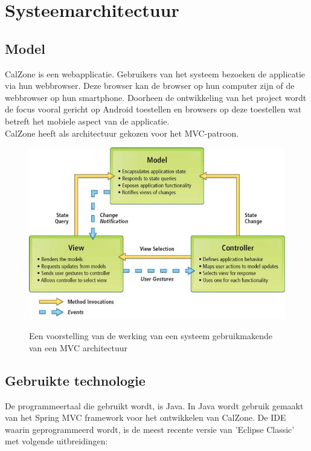 \chapter{Systeemarchitectuur}
\label{chap:architectuur}

\section{Model}
\label{sec:model}
CalZone is een webapplicatie. Gebruikers van het systeem bezoeken de applicatie via hun webbrowser. 
Deze browser kan de browser op hun computer zijn of de webbrowser op hun smartphone.
Doorheen de ontwikkeling van het project wordt de focus vooral gericht op Android toestellen en browsers op deze toestellen wat betreft het mobiele aspect van de applicatie.
\\
CalZone heeft als architectuur gekozen voor het MVC-patroon.\cite{mvc}

\begin{figure}[H]
	\centering
	\includegraphics[scale=0.5]{img/mvc}
	\label{fig:mvc}
	\caption{Een voorstelling van de werking van een systeem gebruikmakende van een MVC architectuur}
\end{figure}

\section{Gebruikte technologie}
\label{sec:technologie}
De programmeertaal die gebruikt wordt, is Java. 
In Java wordt gebruik gemaakt van het Spring MVC framework\cite{spring, spring-mvc} voor het ontwikkelen van CalZone. 
De IDE waarin geprogrammeerd wordt, is de meest recente versie van 'Eclipse Classic' met volgende uitbreidingen:

